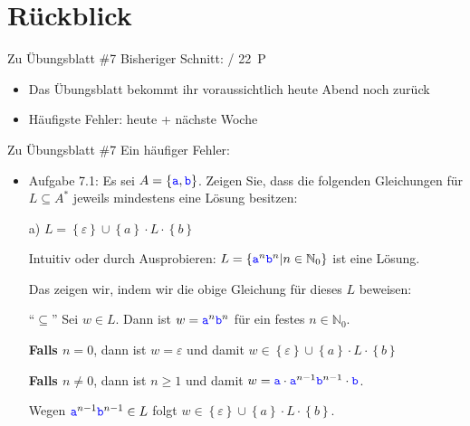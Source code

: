 
\newcommand{\handout}{}



\morescalingdelimiters



\section{Rückblick}

\begin{frame}{Zu Übungsblatt \#7}
	Bisheriger Schnitt:  / 22~P

	\begin{itemize}[<+->]
		\item Das Übungsblatt bekommt ihr voraussichtlich heute Abend noch zurück
		\item Häufigste Fehler: heute + nächste Woche
	\end{itemize}
\end{frame}

\begin{frame}{Zu Übungsblatt \#7}
	Ein häufiger Fehler:
	\begin{itemize}[<+->]
		\item Aufgabe 7.1: Es sei $A = \left\{\hbox{\textcolor{blue}{\texttt{a}}},\hbox{\textcolor{blue}{\texttt{b}}}\right\}$. Zeigen Sie, dass die folgenden Gleichungen für $L\subseteq A^*$ jeweils mindestens eine Lösung besitzen:
		\item[a)] $L = \left\{\varepsilon\right\} \cup \left\{a\right\} \cdot L \cdot \left\{b\right\}$
		\item[] Intuitiv oder durch Ausprobieren: $L=\left\{\hbox{\textcolor{blue}{\texttt{a}}}^n\hbox{\textcolor{blue}{\texttt{b}}}^n \middle| n \in \mathbb N_ 0\right\}$ ist eine Lösung.
		\item[] Das zeigen wir, indem wir die obige Gleichung für dieses $L$ beweisen:
		\item[``$\subseteq$''] Sei $w \in L$. Dann ist $w=\hbox{\textcolor{blue}{\texttt{a}}}^n\hbox{\textcolor{blue}{\texttt{b}}}^n$ für ein festes $n\in\mathbb N_0$.
		\item[] \textbf{Falls $n=0$}, dann ist $w=\varepsilon$ und damit $w \in \left\{\varepsilon\right\} \cup \left\{a\right\} \cdot L \cdot \left\{b\right\}$
		\item[] \textbf{Falls $n\not=0$}, dann ist $n \geq 1$ und damit $w = \hbox{\textcolor{blue}{\texttt{a}}} \cdot \hbox{\textcolor{blue}{\texttt{a}}}^{n-1}\hbox{\textcolor{blue}{\texttt{b}}}^{n-1} \cdot \hbox{\textcolor{blue}{\texttt{b}}}$.
		\item[] \quad Wegen $\hbox{\textcolor{blue}{\texttt{a}}}^{n-1}\hbox{\textcolor{blue}{\texttt{b}}}^{n-1} \in L$ folgt $w \in \left\{\varepsilon\right\} \cup \left\{a\right\} \cdot L \cdot \left\{b\right\}$.
	\end{itemize}
\end{frame}

